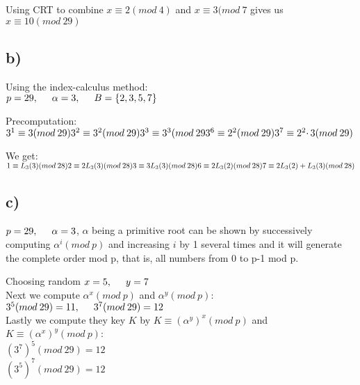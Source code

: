 \documentclass{article}
\begin{document}
Using CRT to combine $x \equiv 2 (mod \: 4)$ and $x \equiv 3 (mod \: 7$ gives us $x \equiv 10 (mod \: 29)$

\subsection*{b)}

Using the index-calculus method:\\
$p=29, \hspace{5mm} \alpha=3, \hspace{5mm} B=\{2,3,5,7\}$

Precomputation:\\
$
3^{1} \equiv 3 (mod \: 29)\\
3^{2} \equiv 3^{2} (mod \: 29)\\
3^{3} \equiv 3^{3} (mod \: 29\\
3^{6} \equiv 2^{2} (mod \: 29)\\
3^{7} \equiv 2^{2} \cdotp 3 (mod \: 29)
$

We get:\\
$
1 \equiv L_{3}(3) (mod \: 28)\\
2 \equiv 2L_{3}(3) (mod \: 28)\\
3 \equiv 3L_{3}(3) (mod \: 28)\\
6 \equiv 2L_{3}(2) (mod \: 28)\\
7 \equiv 2L_{3}(2) + L_{3}(3) (mod \: 28)
$

\subsection*{c)}
$p = 29, \hspace{5mm} \alpha=3$, $\alpha$ being a primitive root can be shown by successively computing $\alpha^{i} (mod \: p)$ and increasing $i$ by 1 several times and it will generate the complete order mod p, that is, all numbers from 0 to p-1 mod p.

Choosing random $x=5, \hspace{5mm} y=7$\\
Next we compute $\alpha^{x} (mod \: p)$ and $\alpha^{y} (mod \: p)$:\\
$3^{5} (mod \: 29) = 11, \hspace{5mm} 3^{7} (mod \: 29) = 12$\\

Lastly we compute they key $K$ by $K \equiv (\alpha^{y})^{x} (mod \: p)$ and $K \equiv (\alpha^{x})^{y} (mod \: p)$:\\
$(3^{7})^{5} (mod \: 29) = 12$\\
$(3^{5})^{7} (mod \: 29) = 12$
\end{document}
